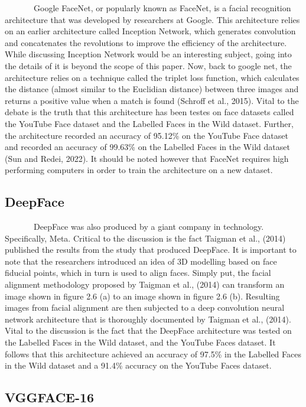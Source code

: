 \documentclass[
  12pt,
]{report}
\begin{document}
~~~~~~~Google FaceNet, or popularly known as FaceNet, is a facial
recognition architecture that was developed by researchers at Google.
This architecture relies on an earlier architecture called Inception
Network, which generates convolution and concatenates the revolutions to
improve the efficiency of the architecture. While discussing Inception
Network would be an interesting subject, going into the details of it is
beyond the scope of this paper. Now, back to google net, the
architecture relies on a technique called the triplet loss function,
which calculates the distance (almost similar to the Euclidian distance)
between three images and returns a positive value when a match is found
(Schroff et al., 2015). Vital to the debate is the truth that this
architecture has been testes on face datasets called the YouTube Face
dataset and the Labelled Faces in the Wild dataset. Further, the
architecture recorded an accuracy of 95.12\% on the YouTube Face dataset
and recorded an accuracy of 99.63\% on the Labelled Faces in the Wild
dataset (Sun and Redei, 2022). It should be noted however that FaceNet
requires high performing computers in order to train the architecture on
a new dataset.

\subsection{DeepFace}\label{deepface}

~~~~~~~DeepFace was also produced by a giant company in technology.
Specifically, Meta. Critical to the discussion is the fact Taigman et
al., (2014) published the results from the study that produced DeepFace.
It is important to note that the researchers introduced an idea of 3D
modelling based on face fiducial points, which in turn is used to align
faces. Simply put, the facial alignment methodology proposed by Taigman
et al., (2014) can transform an image shown in figure 2.6 (a) to an
image shown in figure 2.6 (b). Resulting images from facial alignment
are then subjected to a deep convolution neural network architecture
that is thoroughly documented by Taigman et al., (2014). Vital to the
discussion is the fact that the DeepFace architecture was tested on the
Labelled Faces in the Wild dataset, and the YouTube Faces dataset. It
follows that this architecture achieved an accuracy of 97.5\% in the
Labelled Faces in the Wild dataset and a 91.4\% accuracy on the YouTube
Faces dataset.

\subsection{VGGFACE-16}\label{vggface-16}
\end{document}
